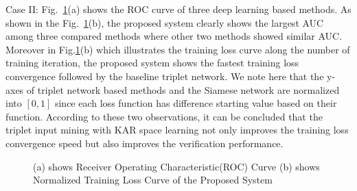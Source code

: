\documentclass[runningheads]{llncs}
\begin{document}
Case II: Fig.~\ref{fig2}(a) shows the ROC curve of three deep learning based methods. As shown in the Fig.~\ref{fig2}(b), the proposed system clearly shows the largest AUC among three compared methods where other two methods showed similar AUC. Moreover in Fig.\ref{fig2}(b) which illustrates the training loss curve along the number of training iteration, the proposed system shows the fastest training loss convergence followed by the baseline triplet network. We note here that the y-axes of triplet network based methods and the Siamese network are normalized into $[0,1]$ since each loss function has difference starting value based on their function. According to these two observations, it can be concluded that the triplet input mining with KAR space learning not only improves the training loss convergence speed but also improves the verification performance.

\begin{figure}[!h]
    \begin{center}
    \caption{(a) shows Receiver Operating Characteristic(ROC) Curve
    (b) shows Normalized Training Loss Curve of the Proposed System }
    \label{fig2}
    \end{center}
 \end{figure}
\end{document}
